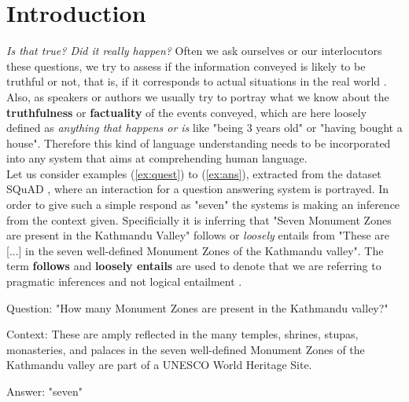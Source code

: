 \label{chap:intr}
\section{Introduction}
\textit{Is that true? Did it really happen?} Often we ask ourselves or our interlocutors these questions, we try to assess if the information conveyed is likely to be truthful or not, that is, if it corresponds to actual situations in the real world \citep{sauri2009factbank}. Also, as speakers or authors we usually try to portray what we know about the \textbf{truthfulness} or \textbf{factuality} of the events conveyed, which are here loosely defined as \textit{anything that happens or is} like "being $3$ years old" or "having bought a house". Therefore this kind of language understanding needs to be incorporated into any system that aims at comprehending human language.\\

Let us consider examples (\ref{ex:quest}) to (\ref{ex:ans}), extracted from the dataset SQuAD \citep{rajpurkar2016squad}, where an interaction for a question answering system is portrayed. In order to give such a simple respond as "seven" the systems is making an inference from the context given. Specificially it is inferring that "Seven Monument Zones are present in the Kathmandu Valley" follows or \textit{loosely} entails from "These are [...] in the seven well-defined Monument Zones of the Kathmandu valley". The term \textbf{follows} and \textbf{loosely entails} are used to denote that we are referring to pragmatic inferences and not logical entailment \citep{manning2006local}.\\ 

\begin{exe}
        \ex\label{ex:quest}
        \begin{xlist}
                \item Question: "How many Monument Zones are present in the Kathmandu valley?" \label{ex:quest}
                \item Context: These are amply reflected in the many temples, shrines, stupas, monasteries, and palaces in the seven well-defined Monument Zones of the Kathmandu valley are part of a UNESCO World Heritage Site.\label{ex:cont}
                \item Answer: "seven"\label{ex:ans}
        \end{xlist}
\end{exe}

